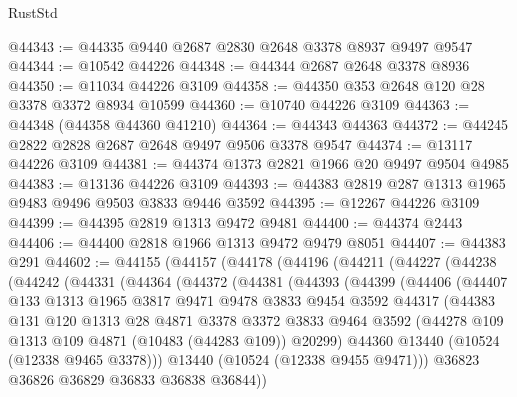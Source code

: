 \begin{lexlean}{RustStd}
\begin{coremodule}
@44343 := @44335 @9440 @2687 @2830 @2648 @3378 @8937 @9497 @9547
@44344 := @10542 @44226
@44348 := @44344 @2687 @2648 @3378 @8936
@44350 := @11034 @44226 @3109
@44358 := @44350 @353 @2648 @120 @28 @3378 @3372 @8934 @10599
@44360 := @10740 @44226 @3109
@44363 := @44348 (@44358 @44360 @41210)
@44364 := @44343 @44363
@44372 := @44245 @2822 @2828 @2687 @2648 @9497 @9506 @3378 @9547
@44374 := @13117 @44226 @3109
@44381 := @44374 @1373 @2821 @1966 @20 @9497 @9504 @4985
@44383 := @13136 @44226 @3109
@44393 := @44383 @2819 @287 @1313 @1965 @9483 @9496 @9503 @3833 @9446 @3592
@44395 := @12267 @44226 @3109
@44399 := @44395 @2819 @1313 @9472 @9481
@44400 := @44374 @2443
@44406 := @44400 @2818 @1966 @1313 @9472 @9479 @8051
@44407 := @44383 @291
@44602 := @44155
    (@44157
      (@44178
        (@44196
          (@44211
            (@44227
              (@44238
                (@44242
                  (@44331
                    (@44364
                      (@44372
                        (@44381
                          (@44393
                            (@44399
                              (@44406
                                (@44407
                                  @133
                                  @1313
                                  @1965
                                  @3817
                                  @9471
                                  @9478
                                  @3833
                                  @9454
                                  @3592
                                  @44317
                                  (@44383
                                    @131
                                    @120
                                    @1313
                                    @28
                                    @4871
                                    @3378
                                    @3372
                                    @3833
                                    @9464
                                    @3592
                                    (@44278 @109 @1313 @109 @4871 (@10483 (@44283 @109)) @20299)
                                    @44360
                                    @13440
                                    (@10524 (@12338 @9465 @3378)))
                                  @13440
                                  (@10524 (@12338 @9455 @9471)))
                                @36823
                                @36826
                                @36829
                                @36833
                                @36838
                                @36844))

\end{coremodule}
\end{lexlean}
